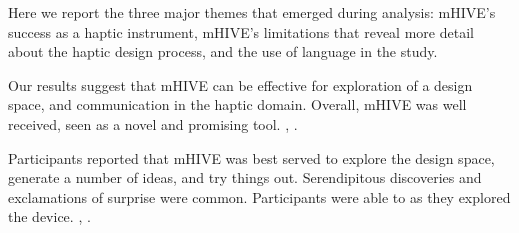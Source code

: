 
%
%
Here we report the three major themes that emerged during analysis: %
%
 mHIVE's success as a haptic instrument, mHIVE's limitations that reveal more detail about the haptic design process, and the use of language in the study.


Our results suggest that mHIVE can be effective for exploration of a design space, and communication in the haptic domain. %
Overall, mHIVE was well received, seen as a novel and promising tool.
,
.


Participants reported that mHIVE was best served to explore the design space, generate a number of ideas, and try things out.
Serendipitous discoveries and exclamations of surprise were common.
Participants were able to  as they explored the device.
	,
	.

